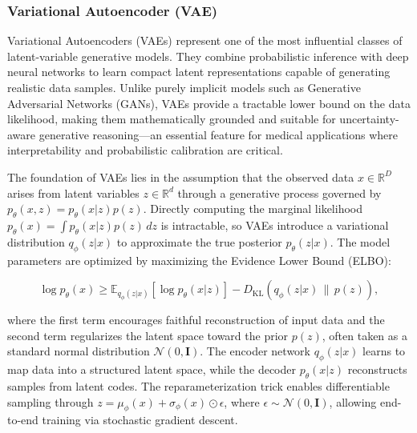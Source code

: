 \subsubsection{Variational Autoencoder (VAE)}
\label{subsubsec:auto-gan-vae}
Variational Autoencoders (VAEs)\cite{kingma2013vae, rezende2014vae} represent one of the most influential classes of latent-variable generative models. They combine probabilistic inference with deep neural networks to learn compact latent representations capable of generating realistic data samples. Unlike purely implicit models such as Generative Adversarial Networks (GANs), VAEs provide a tractable lower bound on the data likelihood, making them mathematically grounded and suitable for uncertainty-aware generative reasoning—an essential feature for medical applications where interpretability and probabilistic calibration are critical.  

\vspace{1em}

The foundation of VAEs lies in the assumption that the observed data \( x \in \mathbb{R}^D \) arises from latent variables \( z \in \mathbb{R}^d \) through a generative process governed by \( p_\theta(x, z) = p_\theta(x|z)p(z) \). Directly computing the marginal likelihood \( p_\theta(x) = \int p_\theta(x|z)p(z) \, dz \) is intractable, so VAEs introduce a variational distribution \( q_\phi(z|x) \) to approximate the true posterior \( p_\theta(z|x) \). The model parameters are optimized by maximizing the Evidence Lower Bound (ELBO):

\begin{equation}
    \log p_\theta(x) \geq 
    \mathbb{E}_{q_\phi(z|x)}[\log p_\theta(x|z)] 
    - D_{\text{KL}}(q_\phi(z|x) \, \| \, p(z)),
\end{equation}

where the first term encourages faithful reconstruction of input data and the second term regularizes the latent space toward the prior \( p(z) \), often taken as a standard normal distribution \( \mathcal{N}(0, \mathbf{I}) \). The encoder network \( q_\phi(z|x) \) learns to map data into a structured latent space, while the decoder \( p_\theta(x|z) \) reconstructs samples from latent codes. The reparameterization trick enables differentiable sampling through \( z = \mu_\phi(x) + \sigma_\phi(x) \odot \epsilon \), where \( \epsilon \sim \mathcal{N}(0, \mathbf{I}) \), allowing end-to-end training via stochastic gradient descent.

\vspace{1em}

